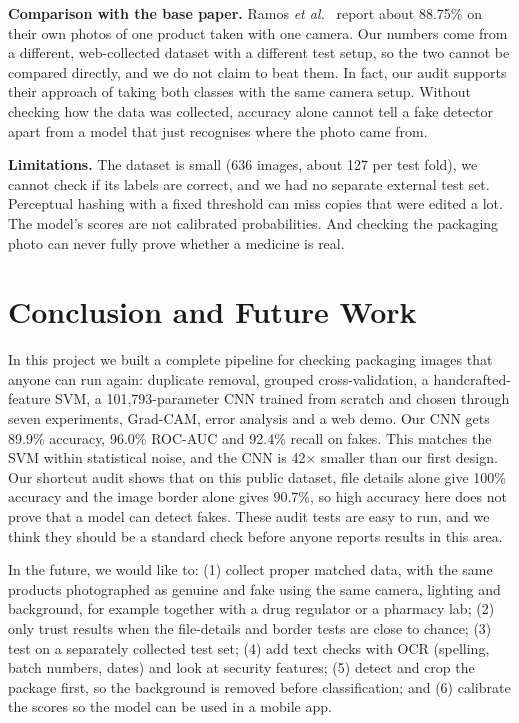 \documentclass[conference]{IEEEtran}
\begin{document}
\textbf{Comparison with the base paper.} Ramos \emph{et al.}~\cite{ramos2024} report about 88.75\% on their own photos of one product taken with one camera. Our numbers come from a different, web-collected dataset with a different test setup, so the two cannot be compared directly, and we do not claim to beat them. In fact, our audit supports their approach of taking both classes with the same camera setup. Without checking how the data was collected, accuracy alone cannot tell a fake detector apart from a model that just recognises where the photo came from.

\textbf{Limitations.} The dataset is small (636 images, about 127 per test fold), we cannot check if its labels are correct, and we had no separate external test set. Perceptual hashing with a fixed threshold can miss copies that were edited a lot. The model's scores are not calibrated probabilities. And checking the packaging photo can never fully prove whether a medicine is real.

\section{Conclusion and Future Work}
In this project we built a complete pipeline for checking packaging images that anyone can run again: duplicate removal, grouped cross-validation, a handcrafted-feature SVM, a 101{,}793-parameter CNN trained from scratch and chosen through seven experiments, Grad-CAM, error analysis and a web demo. Our CNN gets 89.9\% accuracy, 96.0\% ROC-AUC and 92.4\% recall on fakes. This matches the SVM within statistical noise, and the CNN is 42$\times$ smaller than our first design. Our shortcut audit shows that on this public dataset, file details alone give 100\% accuracy and the image border alone gives 90.7\%, so high accuracy here does not prove that a model can detect fakes. These audit tests are easy to run, and we think they should be a standard check before anyone reports results in this area.

In the future, we would like to: (1) collect proper matched data, with the same products photographed as genuine and fake using the same camera, lighting and background, for example together with a drug regulator or a pharmacy lab; (2) only trust results when the file-details and border tests are close to chance; (3) test on a separately collected test set; (4) add text checks with OCR (spelling, batch numbers, dates) and look at security features; (5) detect and crop the package first, so the background is removed before classification; and (6) calibrate the scores so the model can be used in a mobile app.
\end{document}
